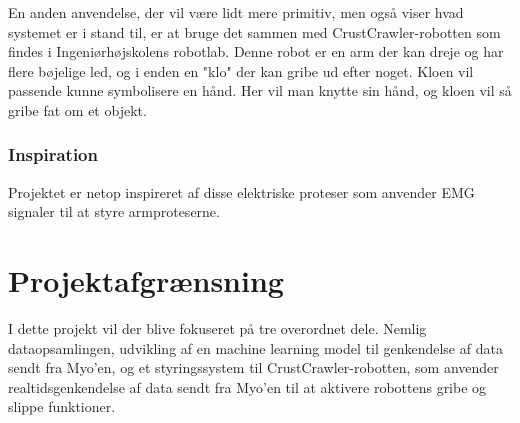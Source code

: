 En anden anvendelse, der vil være lidt mere primitiv, men også viser hvad systemet er i stand til, er at bruge det sammen med CrustCrawler-robotten som findes i Ingeniørhøjskolens robotlab. Denne robot er en arm der kan dreje og har flere bøjelige led, og i enden en "klo" der kan gribe ud efter noget. Kloen vil passende kunne symbolisere en hånd. Her vil man knytte sin hånd, og kloen vil så gribe fat om et objekt.

\subsubsection{Inspiration}
Projektet er netop inspireret af disse elektriske proteser som anvender EMG signaler til at styre armproteserne.

\section{Projektafgrænsning}
I dette projekt vil der blive fokuseret på tre overordnet dele. Nemlig dataopsamlingen, udvikling af en machine learning model til genkendelse af data sendt fra Myo’en, og et styringssystem til CrustCrawler-robotten, som anvender realtidsgenkendelse af data sendt fra Myo’en til at aktivere robottens gribe og slippe funktioner. 

